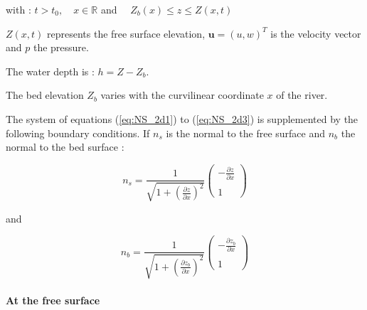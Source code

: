 with : $t> t_0, \quad x \in \mathbb{R}$  and $\quad Z_b(x) \leq z \leq Z(x,t)$

\vspace{0.5cm}

$Z(x,t)$ represents the free surface elevation, $\mathbf{u}=(u,w)^T$ is the velocity vector and $p$ the pressure.

\vspace{0.5cm}

The water depth is : $h = Z - Z_b$. 

\vspace{0.5cm}

The bed elevation $Z_b$ varies with the curvilinear coordinate $x$ of the river.


\vspace{0.5cm}

The system of equations (\ref{eq:NS_2d1}) to (\ref{eq:NS_2d3}) is supplemented by the following boundary conditions. If $n_s$ is the normal to the free surface and $n_b$ the normal to the bed surface : 

\begin{equation}
 n_s = \frac{1}{\displaystyle  \sqrt{1 + \left( \frac{\partial z}{\partial x}\right)^2} }  \left( \begin{array}{c} -\frac{\partial z}{\partial x}\\ \\ 1 \end{array} \right)
\end{equation}

and

\begin{equation}
 n_b = \frac{1}{\displaystyle \sqrt{1 + \left( \frac{\partial z_b}{\partial x}\right)^2}}  \left(\begin{array}{c} -\frac{\partial z_b}{\partial x}\\ \\ 1 \end{array} \right)
\end{equation}

\paragraph{At the free surface\\}


